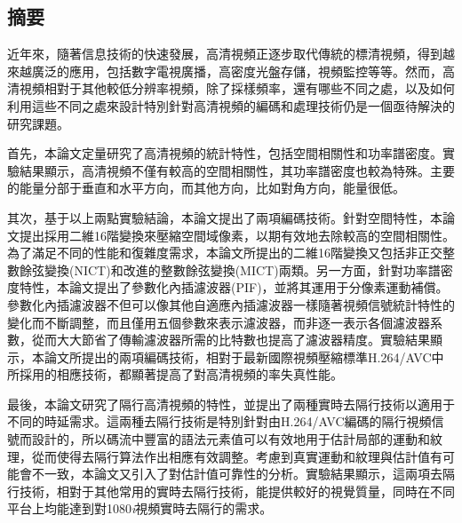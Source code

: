 \begin{CJK*}{UTF8}{hei}

\chapter*{摘要}
近年來，隨著信息技術的快速發展，高清視頻正逐步取代傳統的標清視頻，得到越來越廣泛的應用，包括數字電視廣播，高密度光盤存儲，視頻監控等等。然而，高清視頻相對于其他較低分辨率視頻，除了採樣頻率，還有哪些不同之處，以及如何利用這些不同之處來設計特別針對高清視頻的編碼和處理技術仍是一個亟待解決的研究課題。

首先，本論文定量研究了高清視頻的統計特性，包括空間相關性和功率譜密度。實驗結果顯示，高清視頻不僅有較高的空間相關性，其功率譜密度也較為特殊。主要的能量分部于垂直和水平方向，而其他方向，比如對角方向，能量很低。

其次，基于以上兩點實驗結論，本論文提出了兩項編碼技術。針對空間特性，本論文提出採用二維16階變換來壓縮空間域像素，以期有效地去除較高的空間相關性。為了滿足不同的性能和復雜度需求，本論文所提出的二維16階變換又包括非正交整數餘弦變換(NICT)和改進的整數餘弦變換(MICT)兩類。另一方面，針對功率譜密度特性，本論文提出了參數化內插濾波器(PIF)，並將其運用于分像素運動補償。參數化內插濾波器不但可以像其他自適應內插濾波器一樣隨著視頻信號統計特性的變化而不斷調整，而且僅用五個參數來表示濾波器，而非逐一表示各個濾波器系數，從而大大節省了傳輸濾波器所需的比特數也提高了濾波器精度。實驗結果顯示，本論文所提出的兩項編碼技術，相對于最新國際視頻壓縮標準H.264/AVC中所採用的相應技術，都顯著提高了對高清視頻的率失真性能。

最後，本論文研究了隔行高清視頻的特性，並提出了兩種實時去隔行技術以適用于不同的時延需求。這兩種去隔行技術是特別針對由H.264/AVC編碼的隔行視頻信號而設計的，所以碼流中豐富的語法元素值可以有效地用于估計局部的運動和紋理，從而使得去隔行算法作出相應有效調整。考慮到真實運動和紋理與估計值有可能會不一致，本論文又引入了對估計值可靠性的分析。實驗結果顯示，這兩項去隔行技術，相對于其他常用的實時去隔行技術，能提供較好的視覺質量，同時在不同平台上均能達到對1080\emph{i}視頻實時去隔行的需求。

\end{CJK*}
